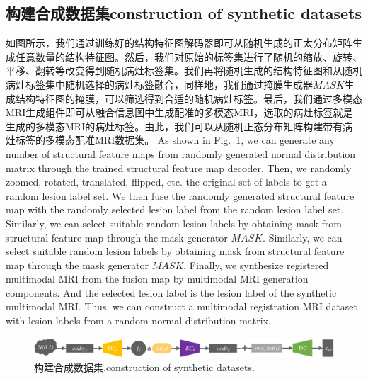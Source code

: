 \documentclass[letterpaper]{article} %
\begin{document}
\subsection{构建合成数据集construction of synthetic datasets}
\label{make dataset}
如图所示，我们通过训练好的结构特征图解码器即可从随机生成的正太分布矩阵生成任意数量的结构特征图。然后，我们对原始的标签集进行了随机的缩放、旋转、平移、翻转等改变得到随机病灶标签集。我们再将随机生成的结构特征图和从随机病灶标签集中随机选择的病灶标签融合，同样地，我们通过掩膜生成器$MASK$生成结构特征图的掩膜，可以筛选得到合适的随机病灶标签。最后，我们通过多模态MRI生成组件即可从融合信息图中生成配准的多模态MRI，选取的病灶标签就是生成的多模态MRI的病灶标签。由此，我们可以从随机正态分布矩阵构建带有病灶标签的多模态配准MRI数据集。
As shown in Fig.~\ref{make_data}, we can generate any number of structural feature maps from randomly generated normal distribution matrix through the trained structural feature map decoder. Then, we randomly zoomed, rotated, translated, flipped, etc. the original set of labels to get a random lesion label set. We then fuse the randomly generated structural feature map with the randomly selected lesion label from the random lesion label set. Similarly, we can select suitable random lesion labels by obtaining mask from structural feature map through the mask generator $MASK$. Similarly, we can select suitable random lesion labels by obtaining mask from structural feature map through the mask generator $MASK$. Finally, we synthesize registered multimodal MRI from the fusion map by multimodal MRI generation components. And the selected lesion label is the lesion label of the synthetic multimodal MRI. Thus, we can construct a multimodal registration MRI dataset with lesion labels from a random normal distribution matrix.
\begin{figure}
	\centering
	\includegraphics[width=0.98\columnwidth]{figures/make_data}
	\caption{构建合成数据集.construction of synthetic datasets.}
	\label{make_data}
\end{figure}
\end{document}
